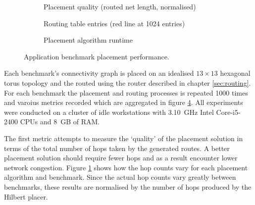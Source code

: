 			\begin{figure}
				\center
				\begin{subfigure}{\linewidth}
					\center
					
					\caption{Placement quality (routed net length, normalised)}
					\label{fig:application-benchmarks-quality}
				\end{subfigure}
				
				\vspace*{1em}
				
				\begin{subfigure}{\linewidth}
					\center
					
					\caption{Routing table entries (red line at \num{1024} entries)}
					\label{fig:application-benchmarks-tables}
				\end{subfigure}
				
				\vspace*{1em}
				
				\begin{subfigure}{\linewidth}
					\center
					
					\caption{Placement algorithm runtime}
					\label{fig:application-benchmarks-runtime}
				\end{subfigure}
				
				\caption{Application benchmark placement performance.}
				\label{fig:application-benchmarks}
			\end{figure}
			
			Each benchmark's connectivity graph is placed on an idealised $13 \times
			13$ hexagonal torus topology and the routed using the router described in
			chapter \ref{sec:routing}. For each benchmark the placement and routing
			processes is repeated \num{1000} times and varoius metrics recorded which
			are aggregated in figure \ref{fig:application-benchmarks}. All
			experiments were conducted on a cluster of idle workstations with
			3.10~GHz Intel Core-i5-2400 CPUs and 8~GB of RAM.
			
			The first metric attempts to measure the `quality' of the placement
			solution in terms of the total number of hops taken by the generated
			routes. A better placement solution should require fewer hops and as a
			result encounter lower network congestion. Figure
			\ref{fig:application-benchmarks-quality} shows how the hop counts vary
			for each placement algorithm and benchmark. Since the actual hop counts
			vary greatly between benchmarks, these results are normalised by the
			number of hops produced by the Hilbert placer.
			
